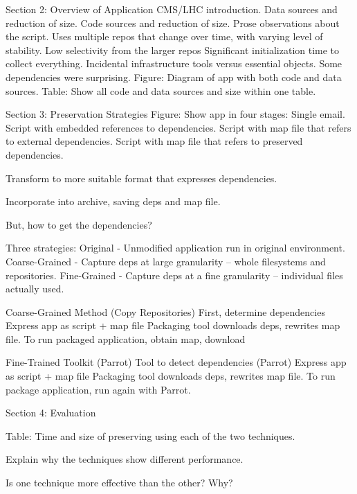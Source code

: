 \documentclass{acm_proc_article-sp}
\begin{document}
Section 2: Overview of Application
    CMS/LHC introduction.
    Data sources and reduction of size.
    Code sources and reduction of size.
    Prose observations about the script.
        Uses multiple repos that change over time, with varying level of stability.
        Low selectivity from the larger repos
        Significant initialization time to collect everything.
        Incidental infrastructure tools versus essential objects.
        Some dependencies were surprising.
    Figure: Diagram of app with both code and data sources.
    Table: Show all code and data sources and size within one table.

Section 3: Preservation Strategies
    Figure: Show app in four stages:
        Single email.
        Script with embedded references to dependencies.
        Script with map file that refers to external dependencies.
        Script with map file that refers to preserved dependencies.

    Transform to more suitable format that expresses dependencies.

    Incorporate into archive, saving deps and map file.

    But, how to get the dependencies?

    Three strategies:
        Original - Unmodified application run in original environment.
        Coarse-Grained - Capture deps at large granularity -- whole filesystems and repositories.
        Fine-Grained - Capture deps at a fine granularity -- individual files actually used.

    Coarse-Grained Method (Copy Repositories)
        First, determine dependencies
        Express app as script + map file
        Packaging tool downloads deps, rewrites map file.
        To run packaged application, obtain map, download

    Fine-Trained Toolkit (Parrot)
        Tool to detect dependencies (Parrot)
        Express app as script + map file
        Packaging tool downloads deps, rewrites map file.
        To run package application, run again with Parrot.

Section 4: Evaluation

    Table: Time and size of preserving using each of the two techniques.

    Explain why the techniques show different performance.

    Is one technique more effective than the other?  Why?
\fi
\end{document}
